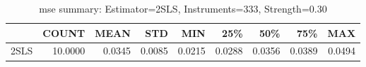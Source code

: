 \begin{table}[ht]
\centering
\caption{mse summary: Estimator=2SLS, Instruments=333, Strength=0.30}
\begin{tabular}{lrrrrrrrr}
\toprule
 & COUNT & MEAN & STD & MIN & 25\% & 50\% & 75\% & MAX \\
\midrule
2SLS & 10.0000 & 0.0345 & 0.0085 & 0.0215 & 0.0288 & 0.0356 & 0.0389 & 0.0494 \\
\bottomrule
\end{tabular}
\end{table}
